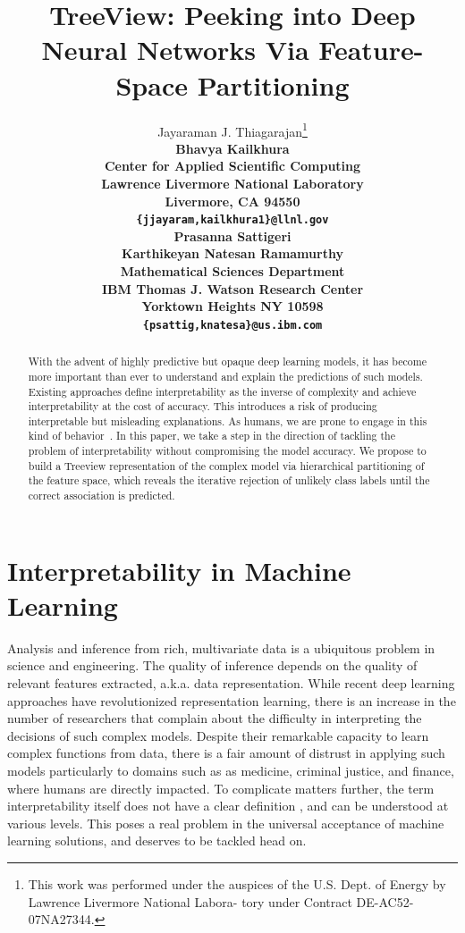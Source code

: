 \documentclass[final]{article}
\title{TreeView: Peeking into Deep Neural Networks Via Feature-Space Partitioning}
\author{
  Jayaraman J. Thiagarajan\thanks{This work was performed under the auspices of the U.S. Dept. of Energy by Lawrence Livermore National Labora- tory under Contract DE-AC52-07NA27344.} \\ \bf Bhavya Kailkhura \\
  Center for Applied Scientific Computing\\
  Lawrence Livermore National Laboratory\\
  Livermore, CA 94550 \\
  \texttt{\{jjayaram,kailkhura1\}@llnl.gov} \\
   \And
  Prasanna Sattigeri \\ \bf Karthikeyan Natesan Ramamurthy \\
  Mathematical Sciences Department\\
  IBM Thomas J. Watson Research Center \\
  Yorktown Heights NY 10598 \\
  \texttt{\{psattig,knatesa\}@us.ibm.com} \\
}
\begin{document}

\maketitle

\begin{abstract}
With the advent of highly predictive but opaque deep learning models, it has become more
important than ever to understand and explain the predictions of such models. Existing approaches
define interpretability as the inverse of complexity and achieve interpretability at the cost of accuracy. This introduces a risk of producing interpretable but misleading explanations. As humans, we are prone to engage in this kind of behavior~\cite{mythos}.
In this paper, we take a step in the direction of tackling the problem of interpretability without compromising the model accuracy. We propose to build a Treeview representation of the complex model via hierarchical partitioning of the feature space, which reveals the iterative rejection of unlikely class labels until the correct association is predicted. 
\end{abstract}

\section{Interpretability in Machine Learning}
Analysis and inference from rich, multivariate data is a ubiquitous problem in science and engineering. The quality of inference depends on the quality of relevant features extracted, a.k.a. data representation. While recent deep learning approaches have revolutionized representation learning, there is an increase in the number of researchers that complain about the difficulty in interpreting the decisions of such complex models. Despite their remarkable capacity to learn complex functions from data, there is a fair amount of distrust in applying such models particularly to domains such as  as medicine, criminal justice, and finance, where humans are directly impacted. To complicate matters further, the term interpretability itself does not have a clear definition \cite{mythos}, and can be understood at various levels. This poses a real problem in the universal acceptance of machine learning solutions, and deserves to be tackled head on.

\end{document}
